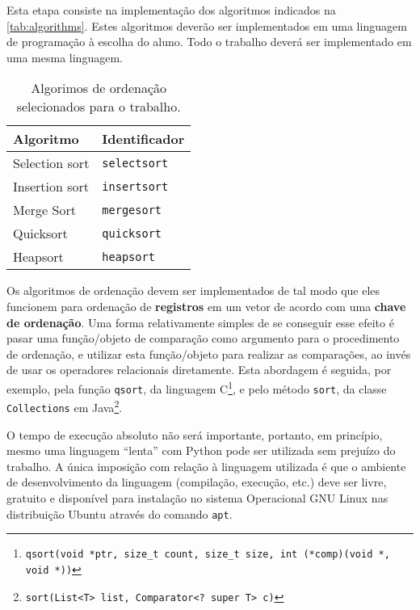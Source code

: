 \documentclass[a4paper,12pt]{scrartcl}
\begin{document}
Esta etapa consiste na implementação dos algoritmos indicados na
\autoref{tab:algorithms}. Estes algoritmos deverão ser implementados em uma
linguagem de programação à escolha do aluno. Todo o trabalho deverá ser
implementado em uma mesma linguagem.

\begin{table}[t]
  \caption{Algorimos de ordenação selecionados para o trabalho.}
  \label{tab:algorithms}
  \begin{center}
    \begin{tabular}{|l|l|}
      \hline
      \textbf{Algoritmo} & \textbf{Identificador} \\
      \hline\hline
      Selection sort     & \texttt{selectsort}    \\
      \hline
      Insertion sort     & \texttt{insertsort}    \\
      \hline
      Merge Sort         & \texttt{mergesort}     \\
      \hline
      Quicksort          & \texttt{quicksort}     \\
      \hline
      Heapsort           & \texttt{heapsort}      \\
      \hline
    \end{tabular}
  \end{center}
\end{table}

Os algoritmos de ordenação devem ser implementados de tal modo que eles
funcionem para ordenação de \textbf{registros} em um vetor de acordo com uma
\textbf{chave de ordenação}. Uma forma relativamente simples de se conseguir
esse efeito é pasar uma função/objeto de comparação como argumento para o
procedimento de ordenação, e utilizar esta função/objeto para realizar as
comparações, ao invés de usar os operadores relacionais diretamente. Esta
abordagem é seguida, por exemplo, pela função \texttt{qsort}, da linguagem
C\footnote{%
  \texttt{qsort(void *ptr, size_t count, size_t size, int (*comp)(void *,
    void *))}}, e pelo método \texttt{sort}, da classe \texttt{Collections} em
Java\footnote{\texttt{sort(List<T> list, Comparator<? super T> c)}}.

O tempo de execução absoluto não será importante, portanto, em princípio, mesmo
uma linguagem ``lenta'' com Python pode ser utilizada sem prejuízo do trabalho.
A única imposição com relação à linguagem utilizada é que o ambiente de
desenvolvimento da linguagem (compilação, execução, etc.) deve ser livre,
gratuito e disponível para instalação no sistema Operacional GNU Linux nas
distribuição Ubuntu através do comando \texttt{apt}.
\end{document}
